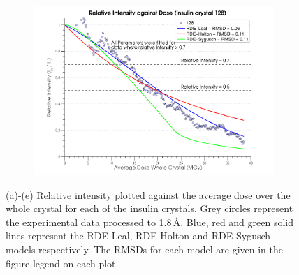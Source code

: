 \begin{figure}[H]
    \ContinuedFloat
    \centering
    \begin{subfigure}[b]{1\textwidth}
        \centering
        \includegraphics[width=\textwidth]{figures/dwd/relintplot128.pdf}
        \caption{}
        \label{Relative Intensity Plots - 128}
    \end{subfigure}
    \caption[Comparison of each dose decay model's ability to predict intensity decay for all insulin data.]{(a)-(e) Relative intensity plotted against the average dose over the whole crystal for each of the insulin crystals. Grey circles represent the experimental data processed to 1.8\,\AA. Blue, red and green solid lines represent the RDE-Leal, RDE-Holton and RDE-Sygusch models respectively. The RMSDs for each model are given in the figure legend on each plot.}
    \label{fig:Relative Intensity Plots}
\end{figure}

